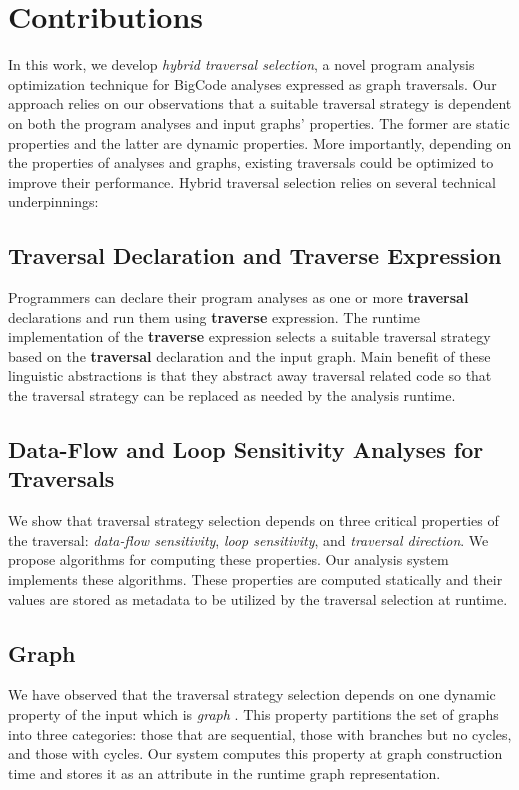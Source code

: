 \chapter{Contributions}

In this work, we develop {\em hybrid traversal selection}, a novel program
analysis optimization technique for BigCode analyses expressed as graph traversals.
Our approach relies on our observations that a suitable traversal strategy is
dependent on both the program analyses and input graphs' properties.
The former are static properties and the latter are dynamic properties.
More importantly, depending on the properties of analyses and graphs, existing
traversals could be optimized to improve their performance.  
Hybrid traversal selection relies on several technical underpinnings: 

\section{Traversal Declaration and Traverse Expression} 
Programmers can declare their program analyses
as one or more {\bf traversal} declarations and run them using {\bf traverse} expression.
The runtime implementation of the {\bf traverse} expression selects a suitable 
traversal strategy based on the {\bf traversal} declaration and the input graph.
Main benefit of these linguistic abstractions is that they abstract away 
traversal related code so that the traversal strategy can be replaced as needed 
by the analysis runtime.

\section{Data-Flow and Loop Sensitivity Analyses for Traversals}
We show that traversal strategy selection depends on three critical properties
of the traversal: {\em data-flow sensitivity}, {\em loop sensitivity}, and 
{\em traversal direction}. We propose algorithms for computing these properties.
Our analysis system implements these algorithms.
These properties are computed statically and their values are stored as metadata 
to be utilized by the traversal selection at runtime.

\section{Graph \Graphprop{}}
We have observed that the traversal strategy selection depends on one
dynamic property of the input which is {\em graph \graphprop{}}. This property partitions
the set of graphs into three categories: those that are sequential, those with branches
but no cycles, and those with cycles. Our system computes this property at 
graph construction time and stores it as an attribute in the runtime graph representation. 

